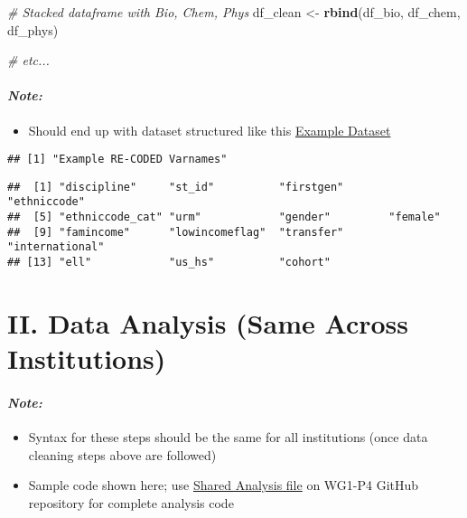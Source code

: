 \documentclass[]{article}
\newenvironment{Shaded}{\begin{snugshade}}{\end{snugshade}}
\newcommand{\KeywordTok}[1]{\textcolor[rgb]{0.13,0.29,0.53}{\textbf{#1}}}
\newcommand{\StringTok}[1]{\textcolor[rgb]{0.31,0.60,0.02}{#1}}
\newcommand{\CommentTok}[1]{\textcolor[rgb]{0.56,0.35,0.01}{\textit{#1}}}
\newcommand{\NormalTok}[1]{#1}
\providecommand{\tightlist}{%
  \setlength{\itemsep}{0pt}\setlength{\parskip}{0pt}}
\let\oldparagraph\paragraph
\renewcommand{\paragraph}[1]{\oldparagraph{#1}\mbox{}}
\begin{document}
\begin{Shaded}
\begin{Highlighting}[]
\CommentTok{# Stacked dataframe with Bio, Chem, Phys}
\NormalTok{df_clean <-}\StringTok{ }\KeywordTok{rbind}\NormalTok{(df_bio, df_chem, df_phys)}

\CommentTok{# etc...}
\end{Highlighting}
\end{Shaded}

\paragraph{\texorpdfstring{\emph{Note:}}{Note:}}\label{note-6}

\begin{itemize}
\tightlist
\item
  Should end up with dataset structured like this
  \href{https://docs.google.com/spreadsheets/d/1Sj5kaFNGUkBhRoOH3cIPm-97UEBZmcFkbKGjzBbKWc0/edit?usp=drive_open\&ouid=118183464940790632947}{Example
  Dataset}
\end{itemize}

\begin{verbatim}
## [1] "Example RE-CODED Varnames"
\end{verbatim}

\begin{verbatim}
##  [1] "discipline"     "st_id"          "firstgen"       "ethniccode"    
##  [5] "ethniccode_cat" "urm"            "gender"         "female"        
##  [9] "famincome"      "lowincomeflag"  "transfer"       "international" 
## [13] "ell"            "us_hs"          "cohort"
\end{verbatim}

\section{\texorpdfstring{\textbf{II. Data Analysis (Same Across
Institutions)}}{II. Data Analysis (Same Across Institutions)}}\label{ii.-data-analysis-same-across-institutions}

\paragraph{\texorpdfstring{\emph{Note:}}{Note:}}\label{note-7}

\begin{itemize}
\tightlist
\item
  Syntax for these steps should be the same for all institutions (once
  data cleaning steps above are followed)
\item
  Sample code shown here; use
  \href{https://github.com/seismic2020/WG1-P4/tree/master/Shared\%20Analysis}{Shared
  Analysis file} on WG1-P4 GitHub repository for complete analysis code
\end{itemize}
\end{document}
